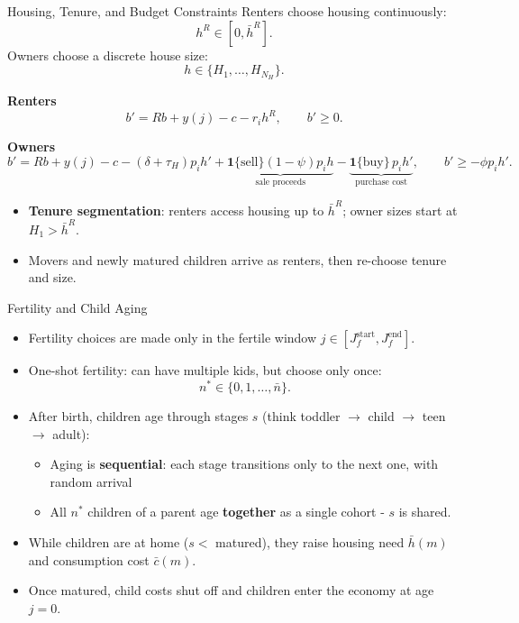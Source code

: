 \documentclass[11pt,aspectratio=169]{beamer}
\begin{document}
\begin{frame}{Housing, Tenure, and Budget Constraints}
\small
Renters choose housing continuously:
\[
h^R \in [0,\bar h^R].
\]
Owners choose a discrete house size:
\[
h \in \{H_1,\ldots,H_{N_H}\}.
\]

\medskip
\textbf{Renters}
\[
b' = Rb + y(j) - c - r_i h^R,
\qquad b' \geq 0.
\]

\textbf{Owners}
\[
b' = Rb + y(j) - c - (\delta+\tau_H)p_i h'
+ \underbrace{\mathbf{1}\{\text{sell}\}(1-\psi)p_i h}_{\text{sale proceeds}}
- \underbrace{\mathbf{1}\{\text{buy}\}\,p_i h'}_{\text{purchase cost}},
\qquad b' \geq -\phi p_i h'.
\]

\medskip
\begin{itemize}
  \item \textbf{Tenure segmentation}: renters access housing up to $\bar h^R$; owner sizes start at $H_1 > \bar h^R$.
  \item Movers and newly matured children arrive as renters, then re-choose tenure and size.
\end{itemize}
\end{frame}

\begin{frame}{Fertility and Child Aging}
\begin{itemize}
  \item Fertility choices are made only in the fertile window $j \in [J_f^{\mathrm{start}},J_f^{\mathrm{end}}]$.
  \item One-shot fertility: can have multiple kids, but choose only once:
  \[
  n^* \in \{0,1,\ldots,\bar n\}.
  \]
  \item After birth, children age through stages $s$ (think toddler $\to$ child $\to$ teen $\to$ adult):
  \begin{itemize}
    \item Aging is \textbf{sequential}: each stage transitions only to the next one, with random arrival
    \item All $n^*$ children of a parent age \textbf{together} as a single cohort - $s$ is shared.
  \end{itemize}
  \item While children are at home ($s < $ matured), they raise housing need $\bar h(m)$ and consumption cost $\bar c(m)$.
  \item Once matured, child costs shut off and children enter the economy at age $j=0$.
\end{itemize}
\end{frame}
\end{document}
